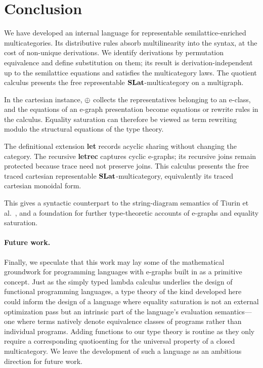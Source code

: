 \section{Conclusion}

We have developed an internal language for representable
semilattice-enriched multicategories.  Its distributive rules absorb
multilinearity into the syntax, at the cost of non-unique derivations.  We
identify derivations by permutation equivalence and define substitution on
them; its result is derivation-independent up to the semilattice equations and
satisfies the multicategory laws.  The quotient calculus presents the free
representable $\mathbf{SLat}$-multicategory on a multigraph.

In the cartesian instance, $\mathbin{\oplus}$ collects the representatives belonging to
an e-class, and the equations of an e-graph presentation become equations or
rewrite rules in the calculus.  Equality saturation can therefore be viewed
as term rewriting modulo the structural equations of the type theory.

The definitional extension \textbf{let} records acyclic sharing without
changing the category.  The recursive \textbf{letrec} captures cyclic
e-graphs; its recursive joins remain protected because trace need not preserve
joins.  This calculus presents the free traced cartesian representable
$\mathbf{SLat}$-multicategory, equivalently its traced cartesian monoidal
form.

This gives a syntactic counterpart to the string-diagram semantics of Tiurin
et al.~\cite{tiurin2025equivalencehypergraphsdporewriting}, and a foundation
for further type-theoretic accounts of e-graphs and equality saturation.

\paragraph{Future work.}
Finally, we speculate that this work may lay some of the mathematical groundwork 
for programming languages with e-graphs built in as a primitive concept.
Just as the simply typed lambda calculus underlies the design of functional 
programming languages, a type theory of the kind developed here could inform the 
design of a language where equality saturation is not an external optimization 
pass but an intrinsic part of the language's evaluation semantics---one where 
terms natively denote equivalence classes of programs rather than individual 
programs.
Adding functions to our type theory is routine as they only require a corresponding quotioenting for the universal property of a closed multicategory.
We leave the development of such a language as an ambitious direction for future 
work.
